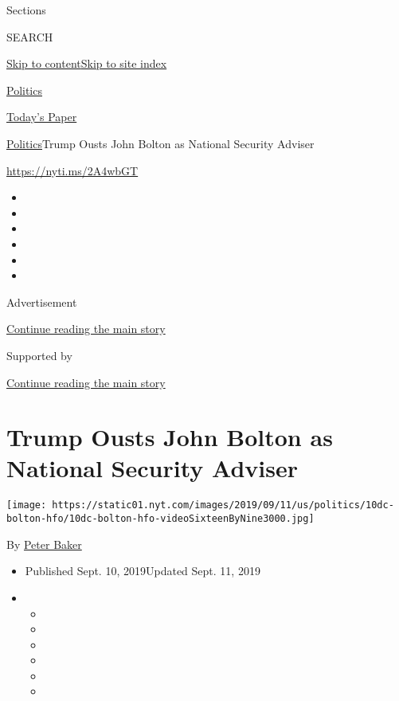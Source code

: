 Sections

SEARCH

\protect\hyperlink{site-content}{Skip to
content}\protect\hyperlink{site-index}{Skip to site index}

\href{https://www.nytimes.com/section/politics}{Politics}

\href{https://myaccount.nytimes.com/auth/login?response_type=cookie\&client_id=vi}{}

\href{https://www.nytimes.com/section/todayspaper}{Today's Paper}

\href{/section/politics}{Politics}\textbar{}Trump Ousts John Bolton as
National Security Adviser

\url{https://nyti.ms/2A4wbGT}

\begin{itemize}
\item
\item
\item
\item
\item
\item
\end{itemize}

Advertisement

\protect\hyperlink{after-top}{Continue reading the main story}

Supported by

\protect\hyperlink{after-sponsor}{Continue reading the main story}

\hypertarget{trump-ousts-john-bolton-as-national-security-adviser}{%
\section{Trump Ousts John Bolton as National Security
Adviser}\label{trump-ousts-john-bolton-as-national-security-adviser}}

\texttt{[image: https://static01.nyt.com/images/2019/09/11/us/politics/10dc-bolton-hfo/10dc-bolton-hfo-videoSixteenByNine3000.jpg]}

By \href{https://www.nytimes.com/by/peter-baker}{Peter Baker}

\begin{itemize}
\item
  Published Sept. 10, 2019Updated Sept. 11, 2019
\item
  \begin{itemize}
  \item
  \item
  \item
  \item
  \item
  \item
  \end{itemize}
\end{itemize}

